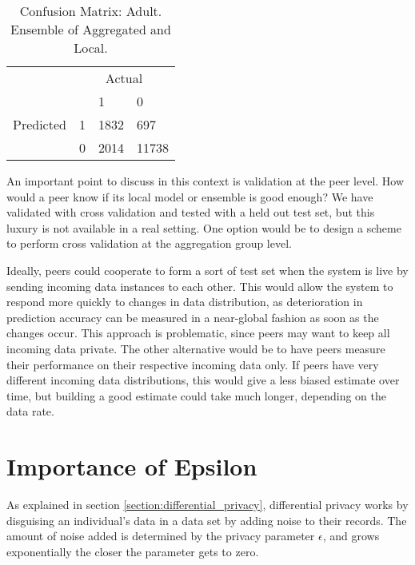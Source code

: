 \begin{table}[h]
	\centering
	\begin{tabular}{llll}
		& \multicolumn{3}{c}{Actual} \\
		\multicolumn{1}{c}{} &                        & 1                         & 0                          \\ \cline{3-4} 
		Predicted            & \multicolumn{1}{l|}{1} & \multicolumn{1}{l|}{1832} & \multicolumn{1}{l|}{697}   \\ \cline{3-4} 
		& \multicolumn{1}{l|}{0} & \multicolumn{1}{l|}{2014} & \multicolumn{1}{l|}{11738} \\ \cline{3-4} 
	\end{tabular}
		\caption{Confusion Matrix: Adult. Ensemble of Aggregated and Local.}
		\label{fig:confmat_adult_ensemble}
\end{table}

An important point to discuss in this context is validation at the peer level. How would a peer know if its local model or ensemble is good enough? We have validated with cross validation and tested with a held out test set, but this luxury is not available in a real setting. One option would be to design a scheme to perform cross validation at the aggregation group level.

Ideally, peers could cooperate to form a sort of test set when the system is live by sending incoming data instances to each other. This would allow the system to respond more quickly to changes in data distribution, as deterioration in prediction accuracy can be measured in a near-global fashion as soon as the changes occur. This approach is problematic, since peers may want to keep all incoming data private. The other alternative would be to have peers measure their performance on their respective incoming data only. If peers have very different incoming data distributions, this would give a less biased estimate over time, but building a good estimate could take much longer, depending on the data rate.



\section{Importance of Epsilon}
As explained in section \ref{section:differential_privacy}, differential privacy works by disguising an individual's data in a data set by adding noise to their records. The amount of noise added is determined by the privacy parameter  $\epsilon$, and grows exponentially the closer the parameter gets to zero. 

